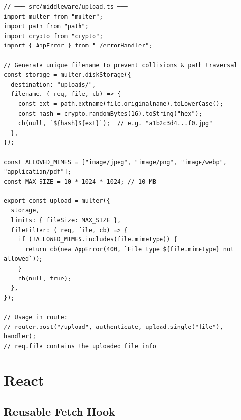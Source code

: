 \documentclass[10pt, a4paper]{article}
\begin{document}
\begin{lstlisting}[language=myjs]
// ─── src/middleware/upload.ts ───
import multer from "multer";
import path from "path";
import crypto from "crypto";
import { AppError } from "./errorHandler";

// Generate unique filename to prevent collisions & path traversal
const storage = multer.diskStorage({
  destination: "uploads/",
  filename: (_req, file, cb) => {
    const ext = path.extname(file.originalname).toLowerCase();
    const hash = crypto.randomBytes(16).toString("hex");
    cb(null, `${hash}${ext}`);  // e.g. "a1b2c3d4...f0.jpg"
  },
});

const ALLOWED_MIMES = ["image/jpeg", "image/png", "image/webp", "application/pdf"];
const MAX_SIZE = 10 * 1024 * 1024; // 10 MB

export const upload = multer({
  storage,
  limits: { fileSize: MAX_SIZE },
  fileFilter: (_req, file, cb) => {
    if (!ALLOWED_MIMES.includes(file.mimetype)) {
      return cb(new AppError(400, `File type ${file.mimetype} not allowed`));
    }
    cb(null, true);
  },
});

// Usage in route:
// router.post("/upload", authenticate, upload.single("file"), handler);
// req.file contains the uploaded file info
\end{lstlisting}


\bigskip


\section{React}


\subsection{Reusable Fetch Hook}
\end{document}
